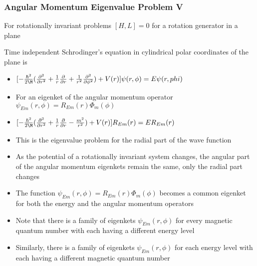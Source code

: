 \documentclass[8pt,t,mathserif,aspectratio=169]{beamer}
\begin{document}
\begin{frame}
  \frametitle{Angular Momentum Eigenvalue Problem V}
  \vspace{1mm}
  For rotationally invariant problems $[H,L] = 0$ for a rotation generator in a plane

  Time independent Schrodinger's equation in cylindrical polar coordinates of the plane is
  \begin{itemize}
    \item $[-{\hbar^2 \over 2 \M} ({\partial^2 \over \partial r^2} + {1 \over r} {\partial \over \partial r} + {1 \over r^2} {\partial^2 \over \partial \phi^2}) + V(r)] \psi(r,\phi) = E \psi(r,phi)$
    \item For an eigenket of the angular momentum operator $\psi_{Em}(r,\phi) = R_{Em}(r) \Phi_m(\phi)$
    \item $[-{\hbar^2 \over 2 \M} ({\partial^2 \over \partial r^2} + {1 \over r} {\partial \over \partial r}- {m^2 \over r^2} ) + V(r)] R_{Em}(r) = E R_{Em}(r)$
    \item This is the eigenvalue problem for the radial part of the wave function
    \item As the potential of a rotationally invariant system changes, the angular part of the angular momentum eigenkets remain the same, only the radial part changes
    \item The function $\psi_{Em}(r,\phi) = R_{Em}(r) \Phi_m(\phi)$ becomes a common eigenket for both the energy and the angular momentum operators
    \item Note that there is a family of eigenkets $\psi_{Em}(r,\phi)$ for every magnetic quantum number with each having a different energy level
    \item Similarly, there is a family of eigenkets $\psi_{Em}(r,\phi)$ for each energy level with each having a different magnetic quantum number
  \end{itemize}
\end{frame}
\end{document}
